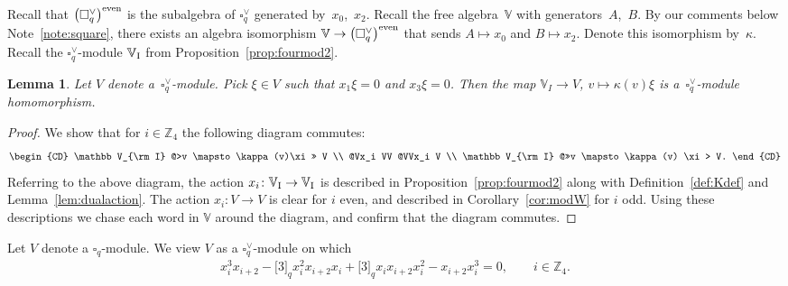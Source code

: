 \documentclass[pdftex]{sigma}
\numberwithin{equation}{section}
\newtheorem{Lemma}[Theorem]{Lemma}
\begin{document}
Recall that $\big(\square^\vee_q\big)^{\rm even}$ is the subalgebra of $\square^\vee_q$ generated by~$x_0$,~$x_2$. Recall the free algebra~$\mathbb V$ with generators~$A$,~$B$. By our comments below Note~\ref{note:square}, there exists an algebra isomorphism $\mathbb V\to \big(\square^\vee_q\big)^{\rm even}$ that sends $A \mapsto x_0$ and $B \mapsto x_2$. Denote this isomorphism by~$\kappa $. Recall the $\square^\vee_q $-module $\mathbb V_{\rm I}$ from Proposition~\ref{prop:fourmod2}. \begin{Lemma}\label{lem:Weta} Let $V$ denote a~$\square^\vee_q$-module. Pick $\xi \in V$ such that $x_1 \xi = 0$ and $x_3 \xi = 0$. Then the map $\mathbb V_I \to V$, $v \mapsto \kappa (v) \xi$ is a~$\square^\vee_q$-module homomorphism.
\end{Lemma}
\begin{proof} We show that for $i \in {\mathbb Z}_4 $ the following diagram commutes:
\begin{gather*}
\begin{CD}
\mathbb V_{\rm I} @>v \mapsto \kappa(v)\xi >>
 V
	 \\
 @Vx_i VV @VVx_i V \\
 \mathbb V_{\rm I} @>>v \mapsto \kappa(v) \xi> V.
 \end{CD}
\end{gather*}
Referring to the above diagram, the action $x_i\colon \mathbb V_{\rm I} \to\mathbb V_{\rm I}$
is described in Proposition~\ref{prop:fourmod2} along with Definition~\ref{def:Kdef} and Lemma~\ref{lem:dualaction}. The action $x_i\colon V\to V$ is clear for $i$ even, and described in
Corollary~\ref{cor:modW} for $i$ odd. Using these descriptions we chase each word in $\mathbb V$ around the diagram, and confirm that the diagram commutes.
\end{proof}

Let $V$ denote a $\square_q$-module. We view $V$ as a $\square^\vee_q$-module on which
\begin{gather*}
 x^3_i x_{i+2} - \lbrack 3 \rbrack_q x^2_i x_{i+2} x_i + \lbrack 3 \rbrack_q x_i x_{i+2} x^2_i -x_{i+2} x^3_i = 0, \qquad i \in \mathbb Z_4.
\end{gather*}
\end{document}
